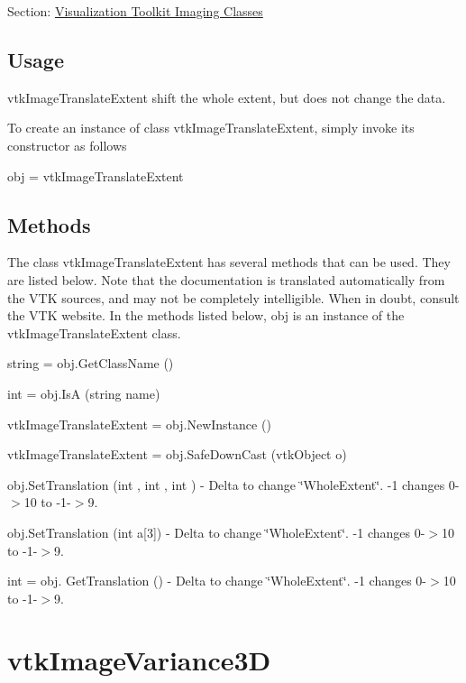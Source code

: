 Section\-: \hyperlink{sec_vtkimaging}{Visualization Toolkit Imaging Classes} \hypertarget{vtkwidgets_vtkxyplotwidget_Usage}{}\subsection{Usage}\label{vtkwidgets_vtkxyplotwidget_Usage}
vtk\-Image\-Translate\-Extent shift the whole extent, but does not change the data.

To create an instance of class vtk\-Image\-Translate\-Extent, simply invoke its constructor as follows \begin{DoxyVerb}  obj = vtkImageTranslateExtent
\end{DoxyVerb}
 \hypertarget{vtkwidgets_vtkxyplotwidget_Methods}{}\subsection{Methods}\label{vtkwidgets_vtkxyplotwidget_Methods}
The class vtk\-Image\-Translate\-Extent has several methods that can be used. They are listed below. Note that the documentation is translated automatically from the V\-T\-K sources, and may not be completely intelligible. When in doubt, consult the V\-T\-K website. In the methods listed below, {\ttfamily obj} is an instance of the vtk\-Image\-Translate\-Extent class. 
\begin{DoxyItemize}
\item {\ttfamily string = obj.\-Get\-Class\-Name ()}  
\item {\ttfamily int = obj.\-Is\-A (string name)}  
\item {\ttfamily vtk\-Image\-Translate\-Extent = obj.\-New\-Instance ()}  
\item {\ttfamily vtk\-Image\-Translate\-Extent = obj.\-Safe\-Down\-Cast (vtk\-Object o)}  
\item {\ttfamily obj.\-Set\-Translation (int , int , int )} -\/ Delta to change \char`\"{}\-Whole\-Extent\char`\"{}. -\/1 changes 0-\/$>$10 to -\/1-\/$>$9.  
\item {\ttfamily obj.\-Set\-Translation (int a\mbox{[}3\mbox{]})} -\/ Delta to change \char`\"{}\-Whole\-Extent\char`\"{}. -\/1 changes 0-\/$>$10 to -\/1-\/$>$9.  
\item {\ttfamily int = obj. Get\-Translation ()} -\/ Delta to change \char`\"{}\-Whole\-Extent\char`\"{}. -\/1 changes 0-\/$>$10 to -\/1-\/$>$9.  
\end{DoxyItemize}\hypertarget{vtkimaging_vtkimagevariance3d}{}\section{vtk\-Image\-Variance3\-D}\label{vtkimaging_vtkimagevariance3d}

